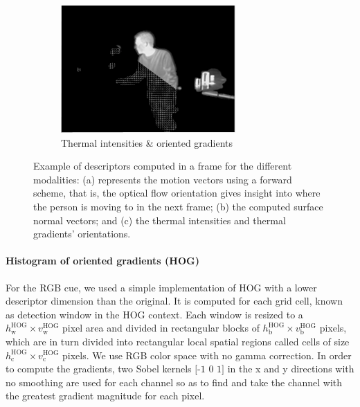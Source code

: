\documentclass[10pt,twocolumn,letterpaper]{article}
\begin{document}
\begin{figure}[ht]
        \begin{subfigure}[b]{0.33\textwidth}
                \includegraphics[width=\textwidth]{hihog.png}
                \caption{Thermal intensities \& oriented gradients}
                \label{fig:thermals}
        \end{subfigure}	
        \caption{Example of descriptors computed in a frame for the different modalities: (a) represents the motion vectors using a forward scheme, that is, the optical flow orientation gives insight into where the person is moving to in the next frame; (b) the computed surface normal vectors; and (c) the thermal intensities and thermal gradients' orientations. }\label{fig:descriptors}
\end{figure}

\paragraph{Histogram of oriented gradients (HOG)}

For the RGB cue, we used a simple implementation of HOG \cite{dalal2005histograms} with a lower descriptor dimension than the original. It is computed for each grid cell, known as detection window in the HOG context. Each window is resized to a $h_\mathrm{w}^\mathrm{HOG} \times v_\mathrm{w}^\mathrm{HOG}$ pixel area and divided in rectangular blocks of $h_\mathrm{b}^\mathrm{HOG} \times v_\mathrm{b}^\mathrm{HOG}$ pixels, which are in turn divided into rectangular local spatial regions called cells of size $h_\mathrm{c}^\mathrm{HOG} \times v_\mathrm{c}^\mathrm{HOG}$ pixels. We use RGB color space with no gamma correction. In order to compute the gradients, two Sobel kernels $\mbox{[-1 0 1]}$ in the x and y directions with no smoothing are used for each channel so as to find and take the channel with the greatest gradient magnitude for each pixel. 
\end{document}
